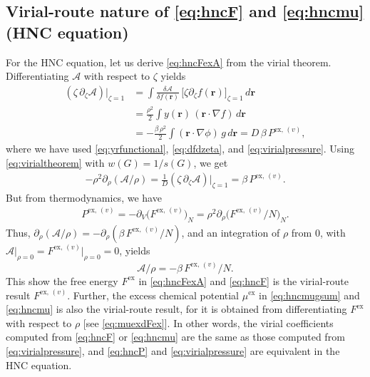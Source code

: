 \documentclass[preprint]{revtex4-1}
\newcommand{\vct}[1]{\mathbf{#1}}
\providecommand{\vr}{} %
\renewcommand{\vr}{\vct{r}}
\newcommand{\supex}[1]{ { { #1 }^{ \mathrm{ex} } } }
\newcommand{\supexv}[1]{ { { #1 }^{ \mathrm{ex}, \, (v) } } }
\newcommand{\Pexv}{\supexv{P}}
\newcommand{\Fex}{\supex{F}}
\newcommand{\Fexv}{\supexv{F}}
\newcommand{\muex}{\supex{\mu}}
\newcommand{\A}{\mathcal{A}}
\begin{document}
\subsection{\label{sec:vthnc}Virial-route nature of \eqref{eq:hncF} and \eqref{eq:hncmu} (HNC equation)}

For the HNC equation, let us derive \eqref{eq:hncFexA} from the virial theorem.
%
Differentiating $\A$ with respect to $\zeta$ yields
\begin{align*}
  (\zeta \, \partial_\zeta \A) \big|_{\zeta = 1}
&=
  \int \frac{ \delta \A } { \delta f(\vr) } \,
  \big[ \zeta \partial_\zeta f(\vr) \big]_{\zeta = 1} \, d\vr
  \\
&=
  \frac{\rho^2}{2}
  \int y(\vr) \,
  (\vr \cdot \nabla f) \, d\vr
  \\
&=
  -\frac{ \beta \, \rho^2}{2}
  \int (\vr \cdot \nabla \phi) \, g \, d\vr
= D \, \beta \, \Pexv,
\end{align*}
where we have used \eqref{eq:yrfunctional},
\eqref{eq:dfdzeta}, and \eqref{eq:virialpressure}.
%
Using \eqref{eq:virialtheorem}
with $w(G) = 1/s(G)$, we get
\begin{align*}
  -\rho^2 \partial_\rho ( \A/\rho )
=
  \frac{1}{D} (\zeta \, \partial_\zeta \A) \big|_{\zeta = 1}
=
  \beta \, \Pexv.
\end{align*}
%
But from thermodynamics, we have
\begin{align*}
  \Pexv
=
  -\partial_V \bigl( \Fexv \bigr)_N
=
  \rho^2 \partial_\rho \bigl( \Fexv/N \bigr)_N.
\end{align*}
%
Thus,
$\partial_\rho (\A/\rho)  = -\partial_\rho( \beta \, \Fexv/N )$,
and an integration of $\rho$ from 0,
with $\A \big|_{\rho = 0} = \Fexv \big|_{\rho = 0} = 0$, yields
\[
  \A/\rho = -\beta \, \Fexv/N.
\]
This show the free energy $\Fex$ in \eqref{eq:hncFexA} and \eqref{eq:hncF}
is the virial-route result $\Fexv$.
%
%
Further, the excess chemical potential
$\muex$ in \eqref{eq:hncmugsum} and \eqref{eq:hncmu}
is also the virial-route result,
for it is obtained from differentiating $\Fex$
with respect to $\rho$
[see \eqref{eq:muexdFex}].
%
In other words,
the virial coefficients computed from
\eqref{eq:hncF} or \eqref{eq:hncmu}
are the same as those computed from
\eqref{eq:virialpressure},
and \eqref{eq:hncP} and \eqref{eq:virialpressure}
are equivalent in the HNC equation.
\end{document}
